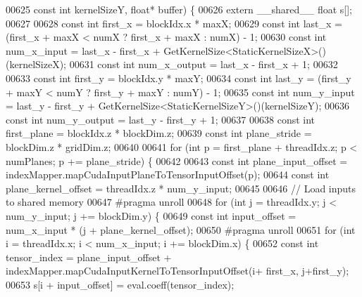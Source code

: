 \begin{DoxyCode}
00625     \textcolor{keyword}{const} \textcolor{keywordtype}{int} kernelSizeY, \textcolor{keywordtype}{float}* buffer) \{
00626   \textcolor{keyword}{extern} \_\_shared\_\_ \textcolor{keywordtype}{float} s[];
00627 
00628   \textcolor{keyword}{const} \textcolor{keywordtype}{int} first\_x = blockIdx.x * maxX;
00629   \textcolor{keyword}{const} \textcolor{keywordtype}{int} last\_x = (first\_x + maxX < numX ? first\_x + maxX : numX) - 1;
00630   \textcolor{keyword}{const} \textcolor{keywordtype}{int} num\_x\_input = last\_x - first\_x + GetKernelSize<StaticKernelSizeX>()(kernelSizeX);
00631   \textcolor{keyword}{const} \textcolor{keywordtype}{int} num\_x\_output = last\_x - first\_x + 1;
00632 
00633   \textcolor{keyword}{const} \textcolor{keywordtype}{int} first\_y = blockIdx.y * maxY;
00634   \textcolor{keyword}{const} \textcolor{keywordtype}{int} last\_y = (first\_y + maxY < numY ? first\_y + maxY : numY) - 1;
00635   \textcolor{keyword}{const} \textcolor{keywordtype}{int} num\_y\_input = last\_y - first\_y + GetKernelSize<StaticKernelSizeY>()(kernelSizeY);
00636   \textcolor{keyword}{const} \textcolor{keywordtype}{int} num\_y\_output = last\_y - first\_y + 1;
00637 
00638   \textcolor{keyword}{const} \textcolor{keywordtype}{int} first\_plane = blockIdx.z * blockDim.z;
00639   \textcolor{keyword}{const} \textcolor{keywordtype}{int} plane\_stride = blockDim.z * gridDim.z;
00640 
00641   \textcolor{keywordflow}{for} (\textcolor{keywordtype}{int} p = first\_plane + threadIdx.z; p < numPlanes; p += plane\_stride) \{
00642 
00643     \textcolor{keyword}{const} \textcolor{keywordtype}{int} plane\_input\_offset = indexMapper.mapCudaInputPlaneToTensorInputOffset(p);
00644     \textcolor{keyword}{const} \textcolor{keywordtype}{int} plane\_kernel\_offset = threadIdx.z * num\_y\_input;
00645 
00646     \textcolor{comment}{// Load inputs to shared memory}
00647 \textcolor{preprocessor}{    #pragma unroll}
00648     \textcolor{keywordflow}{for} (\textcolor{keywordtype}{int} j = threadIdx.y; j < num\_y\_input; j += blockDim.y) \{
00649       \textcolor{keyword}{const} \textcolor{keywordtype}{int} input\_offset = num\_x\_input * (j + plane\_kernel\_offset);
00650 \textcolor{preprocessor}{      #pragma unroll}
00651       \textcolor{keywordflow}{for} (\textcolor{keywordtype}{int} i = threadIdx.x; i < num\_x\_input; i += blockDim.x) \{
00652         \textcolor{keyword}{const} \textcolor{keywordtype}{int} tensor\_index = plane\_input\_offset + indexMapper.mapCudaInputKernelToTensorInputOffset(i+
      first\_x, j+first\_y);
00653         s[i + input\_offset] = eval.coeff(tensor\_index);

\end{DoxyCode}
